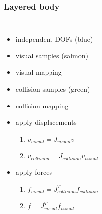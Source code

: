 \documentclass[a4paper,compress]{beamer}
\begin{document}
\begin{frame}
\frametitle{Layered body }
\begin{columns}
\begin{itemize}
\item<1-> independent DOFs (blue)
\item<2-> visual samples (salmon)
\item<3-> visual mapping 
\item<4-> collision samples (green)
\item<4-> collision mapping
\item<5-> apply displacements
\begin{enumerate}
\item $v_{visual} = J_{visual} v$
\item $v_{collision} = J_{collision} v_{visual}$
\end{enumerate}
\item<6-> apply forces
\begin{enumerate}
\item $f_{visual} = J_{collision}^T f_{collision}$
\item $f = J_{visual}^T f_{visual}$
\end{enumerate}
\end{itemize}
\end{columns}
\end{frame}
\end{document}
